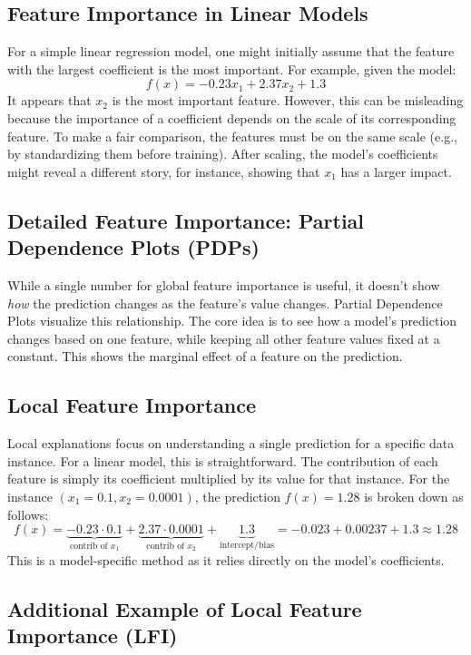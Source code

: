 \documentclass{article}
\begin{document}
\begin{multicols}{2}
\subsection{Feature Importance in Linear Models}
For a simple linear regression model, one might initially assume that the feature with the largest coefficient is the most important. For example, given the model:
$$ f(x) = -0.23x_{1} + 2.37x_{2} + 1.3 $$
It appears that $x_2$ is the most important feature. However, this can be misleading because the importance of a coefficient depends on the scale of its corresponding feature. To make a fair comparison, the features must be on the same scale (e.g., by standardizing them before training). After scaling, the model's coefficients might reveal a different story, for instance, showing that $x_1$ has a larger impact.

\subsection{Detailed Feature Importance: Partial Dependence Plots (PDPs)}
While a single number for global feature importance is useful, it doesn't show \textit{how} the prediction changes as the feature's value changes. Partial Dependence Plots visualize this relationship. The core idea is to see how a model's prediction changes based on one feature, while keeping all other feature values fixed at a constant. This shows the marginal effect of a feature on the prediction.

\subsection{Local Feature Importance}
Local explanations focus on understanding a single prediction for a specific data instance. For a linear model, this is straightforward. The contribution of each feature is simply its coefficient multiplied by its value for that instance. For the instance $(x_1=0.1, x_2=0.0001)$, the prediction $f(x)=1.28$ is broken down as follows:
$$ f(x) = \underbrace{-0.23 \cdot 0.1}_{\text{contrib of } x_1} + \underbrace{2.37 \cdot 0.0001}_{\text{contrib of } x_2} + \underbrace{1.3}_{\text{intercept/bias}} = -0.023 + 0.00237 + 1.3 \approx 1.28 $$
This is a model-specific method as it relies directly on the model's coefficients.


\subsection{Additional Example of Local Feature Importance (LFI)}


\end{multicols}
\end{document}
